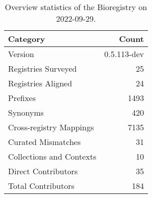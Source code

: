 \begin{table}
\centering
\caption{Overview statistics of the Bioregistry on 2022-09-29.}
\label{tab:bioregistry-summary}
\begin{tabular}{lr}
\toprule
                Category &       Count \\
\midrule
                 Version & 0.5.113-dev \\
     Registries Surveyed &          25 \\
      Registries Aligned &          24 \\
                Prefixes &        1493 \\
                Synonyms &         420 \\
 Cross-registry Mappings &        7135 \\
      Curated Mismatches &          31 \\
Collections and Contexts &          10 \\
     Direct Contributors &          35 \\
      Total Contributors &         184 \\
\bottomrule
\end{tabular}
\end{table}
